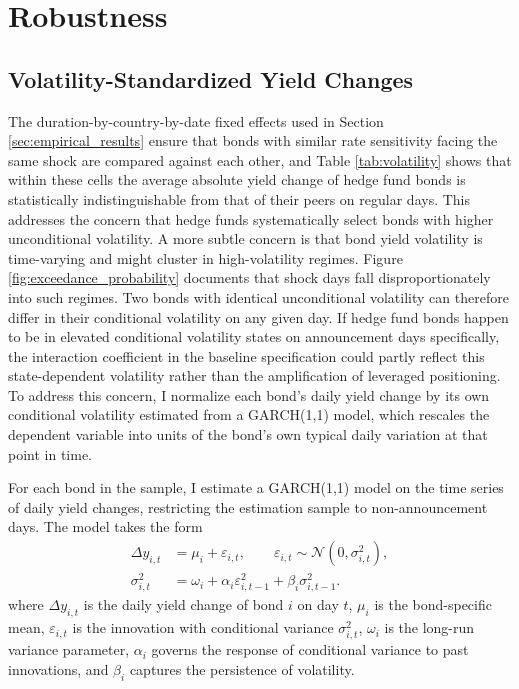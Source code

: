 \documentclass[english, 11pt, oneside]{article}
\begin{document}
\section{Robustness}
\label{sec:robustness_main}
\subsection{Volatility-Standardized Yield Changes}
\label{subsec:GARCH}

The duration-by-country-by-date fixed effects used in Section \ref{sec:empirical_results} ensure that bonds with similar rate sensitivity facing the same shock are compared against each other, and Table \ref{tab:volatility} shows that within these cells the average absolute yield change of hedge fund bonds is statistically indistinguishable from that of their peers on regular days. This addresses the concern that hedge funds systematically select bonds with higher unconditional volatility. A more subtle concern is that bond yield volatility is time-varying and might cluster in high-volatility regimes. Figure \ref{fig:exceedance_probability} documents that shock days fall disproportionately into such regimes. Two bonds with identical unconditional volatility can therefore differ in their conditional volatility on any given day. If hedge fund bonds happen to be in elevated conditional volatility states on announcement days specifically, the interaction coefficient in the baseline specification could partly reflect this state-dependent volatility rather than the amplification of leveraged positioning. To address this concern, I normalize each bond's daily yield change by its own conditional volatility estimated from a GARCH(1,1) model, which rescales the dependent variable into units of the bond's own typical daily variation at that point in time.

For each bond in the sample, I estimate a GARCH(1,1) model on the time series of daily yield changes, restricting the estimation sample to non-announcement days. The model takes the form
\begin{align*}
\Delta y_{i,t} &= \mu_i + \varepsilon_{i,t}, \qquad \varepsilon_{i,t} \sim \mathcal{N}(0, \sigma^2_{i,t}), \\
\sigma^2_{i,t} &= \omega_i + \alpha_i \varepsilon^2_{i,t-1} + \beta_i \sigma^2_{i,t-1}.
\end{align*}
where $\Delta y_{i,t}$ is the daily yield change of bond $i$ on day $t$, $\mu_i$ is the bond-specific mean, $\varepsilon_{i,t}$ is the innovation with conditional variance $\sigma^2_{i,t}$, $\omega_i$ is the long-run variance parameter, $\alpha_i$ governs the response of conditional variance to past innovations, and $\beta_i$ captures the persistence of volatility.
\end{document}
